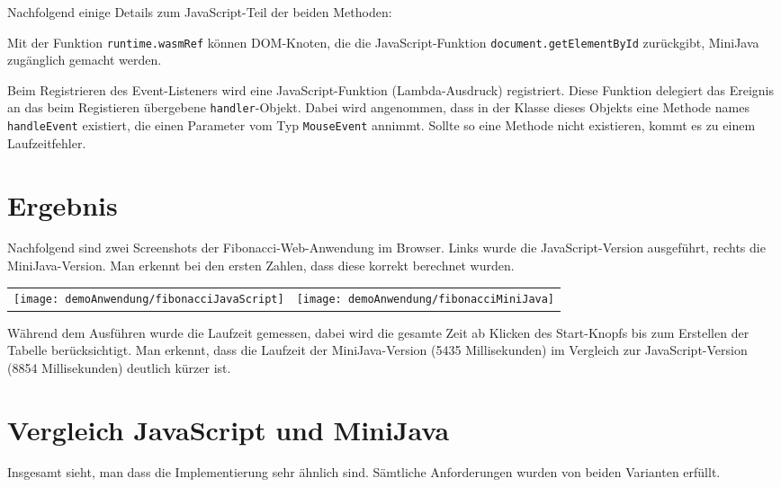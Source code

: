 


Nachfolgend einige Details zum JavaScript-Teil der beiden Methoden:

Mit der Funktion \lstinline{runtime.wasmRef} können DOM-Knoten, die die JavaScript-Funktion \lstinline{document.getElementById} zurückgibt, MiniJava zugänglich gemacht werden.

Beim Registrieren des Event-Listeners wird eine JavaScript-Funktion (Lambda-Aus\-druck) registriert. Diese Funktion delegiert das Ereignis an das beim Registieren übergebene \lstinline{handler}-Objekt. Dabei wird angenommen, dass in der Klasse dieses Objekts eine Methode names \lstinline{handleEvent} existiert, die einen Parameter vom Typ \lstinline{MouseEvent} annimmt. Sollte so eine Methode nicht existieren, kommt es zu einem Laufzeitfehler.

\section{Ergebnis}

Nachfolgend sind zwei Screenshots der Fibonacci-Web-Anwendung im Browser. Links wurde die JavaScript-Version ausgeführt, rechts die MiniJava-Version. Man erkennt bei den ersten Zahlen, dass diese korrekt berechnet wurden.

\begin{center}
    \begin{tabular}{c c}
        \texttt{[image: demoAnwendung/fibonacciJavaScript]} & 
        \texttt{[image: demoAnwendung/fibonacciMiniJava]}
    \end{tabular}
\end{center}

Während dem Ausführen wurde die Laufzeit gemessen, dabei wird die gesamte Zeit ab Klicken des Start-Knopfs bis zum Erstellen der Tabelle berücksichtigt. Man erkennt, dass die Laufzeit der MiniJava-Version (5435 Millisekunden) im Vergleich zur JavaScript-Version (8854 Millisekunden) deutlich kürzer ist.

\section{Vergleich JavaScript und MiniJava}

Insgesamt sieht, man dass die Implementierung sehr ähnlich sind. Sämtliche Anforderungen wurden von beiden Varianten erfüllt.

